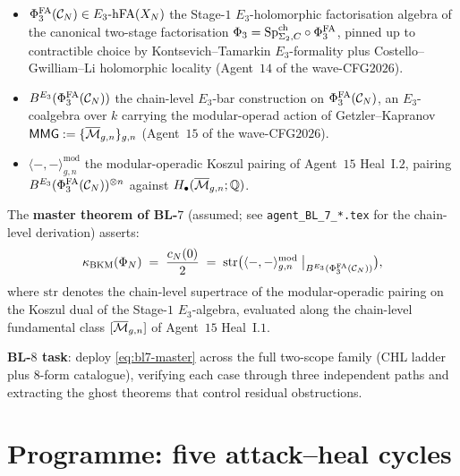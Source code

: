\begin{itemize}
\[\begin{cases}
  (2, 4)            & N = 5, \\
  (1, 2)            & N = 6, \\
  (1, 2)            & N = 7, \\
  (1, 2)            & N = 8,
 \end{cases}
\]
hosted on the $\SpFour$-cover throughout the Nikulin-admissible range;
divergence from brief-stated $(w, c)$-data is reconciled in
Remark~\ref{rem:wave-bl8-brief-primary-lit-divergence}.
\item $\Phi^{\mathrm{FA}}_{3}(\mathcal{C}_N) \in E_{3}\text{-}\mathrm{hFA}(X_N)$ the Stage-$1$ $E_3$-holomorphic
factorisation algebra of the canonical two-stage factorisation
$\Phi_3 = \mathrm{Sp}^{\mathrm{ch}}_{\Sigma_2, C} \circ \Phi^{\mathrm{FA}}_{3}$, pinned up to contractible
choice by Kontsevich--Tamarkin $E_3$-formality plus Costello--Gwilliam--Li
holomorphic locality (Agent~$14$ of the wave-CFG$2026$).
\item $B^{E_{3}}(\Phi^{\mathrm{FA}}_{3}(\mathcal{C}_N))$ the chain-level $E_3$-bar construction on
$\Phi^{\mathrm{FA}}_{3}(\mathcal{C}_N)$, an $E_3$-coalgebra over $k$ carrying the modular-operad
action of Getzler--Kapranov $\mathsf{MMG} := \{\overline{\mathcal{M}}_{g, n}\}_{g, n}$
(Agent~$15$ of the wave-CFG$2026$).
\item $\langle -, - \rangle^{\mathrm{mod}}_{g, n}$ the modular-operadic
Koszul pairing of Agent~$15$ Heal~I.$2$, pairing
$B^{E_{3}}(\Phi^{\mathrm{FA}}_{3}(\mathcal{C}_N))^{\otimes n}$ against $H_\bullet(\overline{\mathcal{M}}_{g, n}; \mathbb{Q})$.
\end{itemize}

The \textbf{master theorem of BL-$7$} (assumed; see
\texttt{agent\_BL\_7\_*.tex} for the chain-level derivation) asserts:
\begin{equation}
\label{eq:bl7-master}
 \kappa_{\mathrm{BKM}}(\Phi_N) \;=\; \frac{c_N(0)}{2}
  \;=\; \mathrm{str}\bigl(
    \langle -, - \rangle^{\mathrm{mod}}_{g, n}
    \bigm|_{B^{E_{3}}(\Phi^{\mathrm{FA}}_{3}(\mathcal{C}_N))}
  \bigr),
\end{equation}
where $\mathrm{str}$ denotes the chain-level supertrace of the
modular-operadic pairing on the Koszul dual of the Stage-$1$ $E_3$-algebra,
evaluated along the chain-level fundamental class $[\overline{\mathcal{M}}_{g, n}]$ of
Agent~$15$ Heal~I.$1$.

\textbf{BL-$8$ task}: deploy \eqref{eq:bl7-master} across the full
two-scope family (CHL ladder plus 8-form catalogue), verifying each case
through three independent paths and extracting the ghost theorems that
control residual obstructions.

\section*{Programme: five attack--heal cycles}

